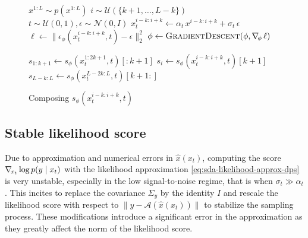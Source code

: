 \begin{figure}[t]
\begin{minipage}[t]{0.49\textwidth}%
\vspace{-1em}
\begin{algorithm}[H]
    \caption{Training $\epsilon_\phi(x^{i-k:i+k}_t, t)$} \label{alg:training}
    \begin{algorithmic}[1]
            \State $x^{1:L} \sim p(x^{1:L})$
            \State $i \sim \mathcal{U}(\{k+1, \dots, L-k\})$
            \State $t \sim \mathcal{U}(0, 1), \epsilon \sim \mathcal{N}(0, I)$
            \State $x^{i-k:i+k}_t \gets \alpha_t \, x^{i-k:i+k} + \sigma_t \, \epsilon$
            \State $\displaystyle \ell \gets \| \epsilon_\phi(x^{i-k:i+k}_t, t) - \epsilon \|_2^2$
            \State $\phi \gets \Call{GradientDescent}{\phi, \grad{\phi} \, \ell}$
        \EndFor{}
	\end{algorithmic}
\end{algorithm}
\end{minipage}
\hfill
\begin{minipage}[t]{0.49\textwidth}%
\vspace{-1em}
\begin{algorithm}[H]
    \caption{Composing $s_\phi(x^{i-k:i+k}_t, t)$} \label{alg:composing}
    \begin{algorithmic}[1]
            \State $s_{1:k+1} \gets s_\phi(x^{1:2k+1}_t, t)[:\!k + 1]$
                \State $s_i \gets s_\phi(x^{i-k:i+k}_t, t)[k+1]$
            \EndFor{}
            \State $s_{L-k:L} \gets s_\phi(x^{L-2k:L}_t, t)[k+1\!:]$
            \State {}
        \EndFunction{}
	\end{algorithmic}
\end{algorithm}
\end{minipage}
\end{figure}

\subsection{Stable likelihood score} \label{sec:sda-sda-likelihood-score}

Due to approximation and numerical errors in $\hat{x}(x_t)$, computing the score $\nabla_{\!{x_t}} \log p(y \mid x_t)$ with the likelihood approximation \eqref{eq:sda-likelihood-approx-dps} is very unstable, especially in the low signal-to-noise regime, that is when $\sigma_t \gg \alpha_t$. This incites \textcite{chung2023diffusion} to replace the covariance $\Sigma_y$ by the identity $I$ and rescale the likelihood score with respect to $\|y - \mathcal{A}(\hat{x}(x_t))\|$ to stabilize the sampling process. These modifications introduce a significant error in the approximation as they greatly affect the norm of the likelihood score.

